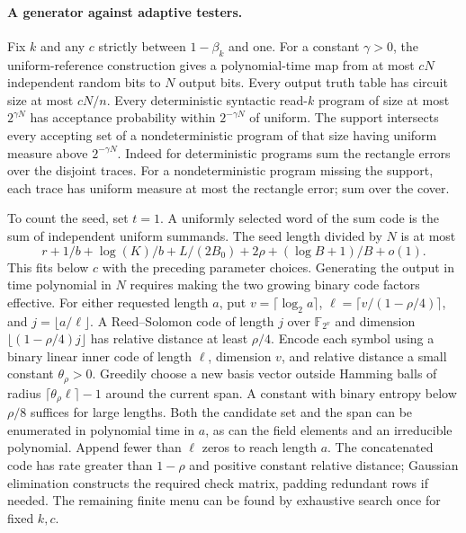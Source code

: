 \paragraph{A generator against adaptive testers.}
Fix $k$ and any $c$ strictly between $1-\beta_k$ and one. For a constant $\gamma>0$, the uniform-reference construction gives a polynomial-time map from at most $cN$ independent random bits to $N$ output bits. Every output truth table has circuit size at most $cN/n$. Every deterministic syntactic read-$k$ program of size at most $2^{\gamma N}$ has acceptance probability within $2^{-\gamma N}$ of uniform. The support intersects every accepting set of a nondeterministic program of that size having uniform measure above $2^{-\gamma N}$. Indeed for deterministic programs sum the rectangle errors over the disjoint traces. For a nondeterministic program missing the support, each trace has uniform measure at most the rectangle error; sum over the cover.

To count the seed, set $t=1$. A uniformly selected word of the sum code is the sum of independent uniform summands. The seed length divided by $N$ is at most
\[
 r+1/b+\log(K)/b+L/(2B_0)+2\rho+(\log B+1)/B+o(1).
\]
This fits below $c$ with the preceding parameter choices. Generating the output in time polynomial in $N$ requires making the two growing binary code factors effective. For either requested length $a$, put $v=\lceil\log_2 a\rceil$, $\ell=\lceil v/(1-\rho/4)\rceil$, and $j=\lfloor a/\ell\rfloor$. A Reed--Solomon code of length $j$ over $\mathbb F_{2^v}$ and dimension $\lfloor(1-\rho/4)j\rfloor$ has relative distance at least $\rho/4$. Encode each symbol using a binary linear inner code of length $\ell$, dimension $v$, and relative distance a small constant $\theta_\rho>0$. Greedily choose a new basis vector outside Hamming balls of radius $\lceil\theta_\rho\ell\rceil-1$ around the current span. A constant with binary entropy below $\rho/8$ suffices for large lengths. Both the candidate set and the span can be enumerated in polynomial time in $a$, as can the field elements and an irreducible polynomial. Append fewer than $\ell$ zeros to reach length $a$. The concatenated code has rate greater than $1-\rho$ and positive constant relative distance; Gaussian elimination constructs the required check matrix, padding redundant rows if needed. The remaining finite menu can be found by exhaustive search once for fixed $k,c$.

